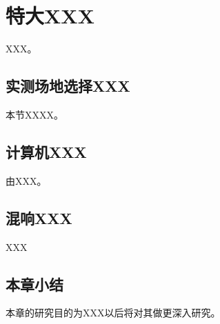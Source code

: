 
\chapter{特大XXX}

XXX。


\section{实测场地选择XXX}\label{sec:test_describe_and_measurements}

本节XXXX。

\FloatBarrier
\section{计算机XXX}
\label{sec:simulation_discribe}

由XXX。

\FloatBarrier
\section{混响XXX}

XXX

\FloatBarrier
\section{本章小结}

本章的研究目的为XXX以后将对其做更深入研究。
